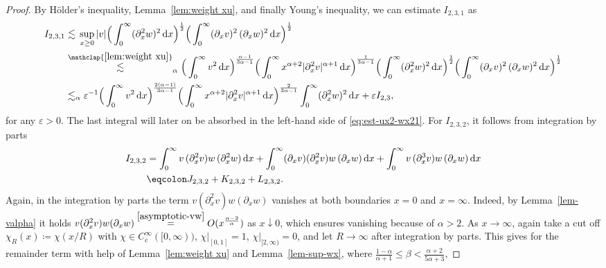 \documentclass[reqno,12pt]{amsart}
\renewcommand{\d}{\ensuremath{\mathrm{d}}}
\renewcommand{\d}{\ensuremath{{\rm d}}}
\numberwithin{equation}{section}
\begin{document}
\begin{proof}
By H\"older's inequality, Lemma~\ref{lem:weight xu}, and finally Young's inequality, we can estimate $I_{2,3,1}$ as 
%
\begin{align} \label{eq:estimate_I_3}
    I_{2,3,1} 
    &\lesssim 
    \, \sup_{x\geq 0} |v| \Big(\int_0^\infty (\partial_x^2 w)^2 \, \d x\Big)^{\frac{1}{2}} \Big(\int_0^\infty (\partial_x v)^2\,(\partial_x w)^2 \, \d x \Big)^{\frac{1}{2}}
    \nonumber\\&\stackrel{\mathclap{\eqref{lem:weight xu}}}
    {\lesssim}_{\alpha}
    \Big(\int_0^\infty v^2\, \d x\Big)^\frac{\alpha-1}{3\alpha-1} \Big(\int_0^\infty x^{\alpha+2} |\partial_x^2 v|^{\alpha+1}\, \d x\Big)^\frac{1}{3\alpha-1}
    \Big(\int_0^\infty (\partial_x^2 w)^2 \, \d x\Big)^{\frac{1}{2}} \Big(\int_0^\infty (\partial_x v)^2\,(\partial_x w)^2 \, \d x \Big)^{\frac{1}{2}}
    \nonumber \\
    &\lesssim_\alpha \varepsilon^{-1}
    \Big(\int_0^\infty v^2\, \d x\Big)^\frac{2(\alpha-1)}{3\alpha-1} \Big(\int_0^\infty x^{\alpha+2} |\partial_x^2 v|^{\alpha+1}\, \d x\Big)^\frac{2}{3\alpha-1}
    \int_0^\infty (\partial_x^2 w)^2 \, \d x
    + \varepsilon I_{2,3}, 
\end{align}
%
for any $\varepsilon>0$. The last integral will later on be absorbed in the left-hand side of \eqref{eq:est-ux2-wx21}.
For $I_{2,3,2}$, it follows from integration by parts
%
\begin{align}
\label{eq:u-uxx-wxx1} 
    I_{2,3,2}
    &=  \int_0^\infty v \, ( \partial_x^2 v) w\,  (\partial_x^2 w) \, \d x  +  \int_0^\infty  ( \partial_x v) ( \partial_x^2 v) w \, (\partial_x w)  \, \d x  + \int_0^\infty v \, ( \partial_x^3 v) w\,  (\partial_x w) \, \d x \nonumber \\
    &\eqcolon J_{2,3,2} + K_{2,3,2}+ L_{2,3,2}. 
\end{align}
%
Again, in the integration by parts the term $v (\partial_x^2 v) w (\partial_x w)$ vanishes at both boundaries $x = 0$ and $x = \infty$. Indeed, by Lemma~\ref{lem-valpha} it holds $v (\partial_x^2 v) w (\partial_x w) \stackrel{\eqref{asymptotic-vw}}{=} O(x^{\frac{\alpha-2}{\alpha}})$ as $x \downarrow 0$, which ensures vanishing because of $\alpha > 2$. As $x \to \infty$, again take a cut off $\chi_R(x)  \coloneq \chi(x/R)$ with
$\chi \in C^\infty_\mathrm{c}([0,\infty))$,
$\chi|_{[0,1]} = 1$, $\chi|_{[2,\infty)} = 0$, and let $R \to \infty$ after integration by parts. This gives for the remainder term with help of Lemma~\ref{lem:weight xu} and Lemma~\ref{lem-sup-wx}, where $\frac{1-\alpha}{\alpha +1} \le \beta < \frac{\alpha+2}{5\alpha +3}$,

\end{proof}
\end{document}
